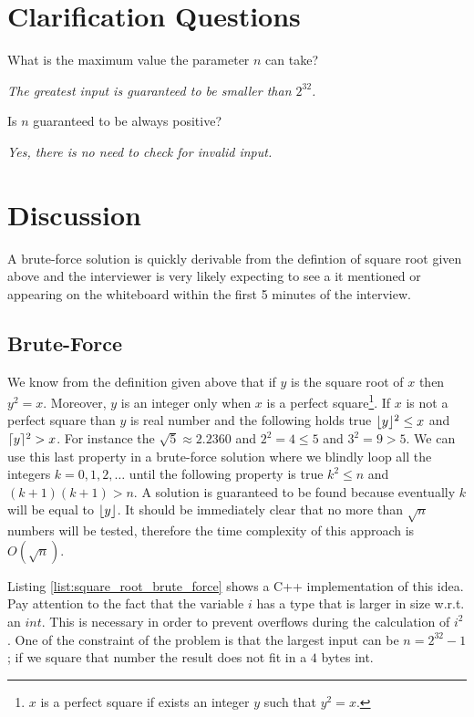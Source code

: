 \section{Clarification Questions}
\begin{QandA}
	\item What is the maximum value the parameter $n$ can take?
	\begin{answered}
		\textit{The greatest input is guaranteed to be smaller than $2^{32}$.}
	\end{answered}
	
	\item Is $n$ guaranteed to be always positive?
	\begin{answered}
		\textit{Yes, there is no need to check for invalid input.}
	\end{answered}
\end{QandA}

\section{Discussion}
A brute-force solution is quickly derivable from the defintion of square root given above and the interviewer
is very likely expecting to see a it mentioned or appearing on the whiteboard
within the first 5 minutes of the interview. 

\subsection{Brute-Force}
We know from the definition given above that if $y$ is the square root of $x$ then $y^2 = x$. Moreover,
$y$ is an integer only when $x$ is a perfect square\footnote{$x$ is a perfect square if exists an integer $y$ such that $y^2=x$.}. 
If $x$ is not a perfect square than $y$ is real number and the following holds true
$\lfloor y\rfloor^2 \leq x$ and $\lceil y\rceil^2 > x$. For instance the $\sqrt{5} \approx 2.2360$ and $2^2=4 \leq 5$ and $3^2=9 > 5$.
We can use this last property in a brute-force solution where we blindly loop all the integers $k=0,1,2,\ldots$ until 
the following property is true $k^2\leq n$ and $(k+1)(k+1) > n$.
A solution is guaranteed to be found because eventually $k$ will be equal to $\lfloor y\rfloor$.
It should be immediately clear that no more than $\sqrt{n}$ numbers will be tested, therefore the time complexity of this approach is $O(\sqrt{n})$.

Listing \ref{list:square_root_brute_force} shows a C++ implementation of this idea.
Pay attention to the fact that the variable $i$ has a type that is larger in size w.r.t. an
$int$. This is necessary in order to prevent overflows during the calculation of $i^2$. 
One of the constraint of the problem is that the largest input can be $n=2^{32}-1$; if we square that number the result does not fit in a $4$ bytes int.

